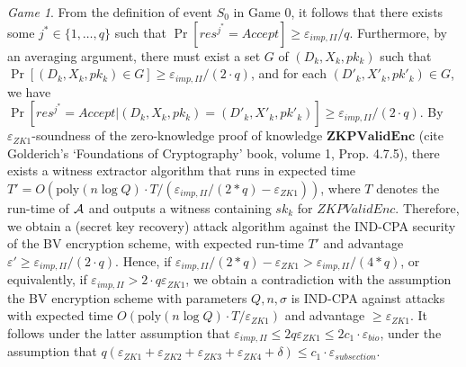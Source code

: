 \textit{Game 1}. From the definition of event $S_0$ in Game 0, it follows that there exists some $j^* \in \{1,\ldots,q\}$ such that $\Pr[res^{j^*} = Accept] \geq \varepsilon_{imp,II}/q$. Furthermore, by an averaging argument, there must exist a set $G$ of $(D_k,X_k,pk_k)$ such that $\Pr[(D_k,X_k,pk_k) \in G] \geq \varepsilon_{imp,II}/(2 \cdot q)$, and for each $(D'_k,X'_k,pk'_k) \in G$, we have $\Pr[res^{j^*} = Accept |(D_k,X_k,pk_k)=(D'_k,X'_k,pk'_k)] \geq  \varepsilon_{imp,II}/(2 \cdot q)$. By $\varepsilon_{ZK1}$-soundness of the zero-knowledge proof of knowledge $\mathbf{ZKPValidEnc}$ (cite Golderich's `Foundations of Cryptography' book, volume 1, Prop. 4.7.5), there exists a witness extractor algorithm that runs in expected time $T'=O(\mathrm{poly}(n \log Q) \cdot T / (\varepsilon_{imp,II}/(2*q) - \varepsilon_{ZK1}))$, where $T$ denotes the run-time of $\mathcal{A}$ and outputs a witness containing $sk_k$ for ${ZKPValidEnc}$. Therefore, we obtain a (secret key recovery) attack algorithm against the IND-CPA security of the BV encryption scheme, with expected run-time $T'$ and advantage $\varepsilon' \geq \varepsilon_{imp,II}/(2 \cdot q)$. Hence,  if $\varepsilon_{imp,II}/(2*q) - \varepsilon_{ZK1} > \varepsilon_{imp,II}/(4*q)$, or equivalently, if $\varepsilon_{imp,II} > 2 \cdot q \varepsilon_{ZK1}$, we obtain a contradiction with the assumption the BV encryption scheme with parameters $Q,n,\sigma$ is IND-CPA against attacks with expected time $O(\mathrm{poly}(n \log Q) \cdot T / \varepsilon_{ZK1})$ and advantage $\geq \varepsilon_{ZK1}$. It follows under the latter assumption that $\varepsilon_{imp,II} \leq 2q \varepsilon_{ZK1} \leq 2 c_1  \cdot \varepsilon_{bio}$, under the assumption that  $q(\varepsilon_{ZK1}+\varepsilon_{ZK2} +
\varepsilon_{ZK3} + \varepsilon_{ZK4} + \delta) \leq c_1 \cdot \varepsilon_{subsection}$.


